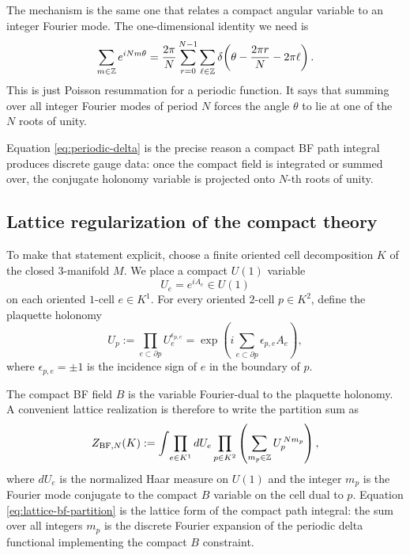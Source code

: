 The mechanism is the same one that relates a compact angular variable to an integer Fourier mode. The one-dimensional identity we need is
\begin{equation}\label{eq:periodic-delta}
\sum_{m\in \mathbb{Z}} e^{iNm\theta}
=
\frac{2\pi}{N}\sum_{r=0}^{N-1}\sum_{\ell\in \mathbb{Z}}
\delta\!\left(\theta-\frac{2\pi r}{N}-2\pi \ell\right).
\end{equation}
This is just Poisson resummation for a periodic function. It says that summing over all integer Fourier modes of period $N$ forces the angle $\theta$ to lie at one of the $N$ roots of unity.

\medskip

\noindent Equation \eqref{eq:periodic-delta} is the precise reason a compact BF path integral produces discrete gauge data: once the compact field is integrated or summed over, the conjugate holonomy variable is projected onto $N$-th roots of unity.

\subsection{Lattice regularization of the compact theory}

To make that statement explicit, choose a finite oriented cell decomposition $K$ of the closed $3$-manifold $M$. We place a compact $U(1)$ variable
\begin{equation*}
U_e = e^{iA_e}\in U(1)
\end{equation*}
on each oriented $1$-cell $e\in K^1$. For every oriented $2$-cell $p\in K^2$, define the plaquette holonomy
\begin{equation}\label{eq:plaquette-holonomy}
U_p := \prod_{e\subset \partial p} U_e^{\epsilon_{p,e}}
=
\exp\!\left(i\sum_{e\subset \partial p}\epsilon_{p,e}A_e\right),
\end{equation}
where $\epsilon_{p,e}=\pm 1$ is the incidence sign of $e$ in the boundary of $p$.

\medskip

\noindent The compact BF field $B$ is the variable Fourier-dual to the plaquette holonomy. A convenient lattice realization is therefore to write the partition sum as
\begin{equation}\label{eq:lattice-bf-partition}
Z_{\mathrm{BF},N}(K)
:=
\int\!\prod_{e\in K^1} dU_e
\prod_{p\in K^2}
\left(\sum_{m_p\in \mathbb{Z}} U_p^{\,Nm_p}\right),
\end{equation}
where $dU_e$ is the normalized Haar measure on $U(1)$ and the integer $m_p$ is the Fourier mode conjugate to the compact $B$ variable on the cell dual to $p$. Equation \eqref{eq:lattice-bf-partition} is the lattice form of the compact path integral: the sum over all integers $m_p$ is the discrete Fourier expansion of the periodic delta functional implementing the compact $B$ constraint.

